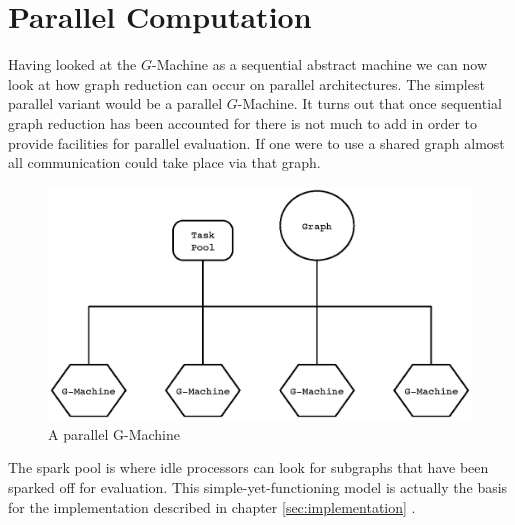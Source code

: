 \section{Parallel Computation}
    Having looked at the $G$-Machine as a sequential abstract machine we can now
look at how graph reduction can occur on parallel architectures. The simplest
parallel variant would be a parallel $G$-Machine. It turns out that once
sequential graph reduction has been accounted for there is not much to add in
order to provide facilities for parallel evaluation. If one were to use a shared
graph almost all communication could take place via that graph.

\begin{figure}[hb]
  \centering
  \includegraphics[scale=0.7]{Background/figures/simpleParallel.eps}
  \caption[Simple parallel graph reduction model]
   {A parallel G-Machine}
    \label{fig:simpleGMachine}
\end{figure}

The spark pool is where idle processors can look for subgraphs that have been
sparked off for evaluation. This simple-yet-functioning model is actually the
basis for the implementation described in chapter \ref{sec:implementation}
\cite{PeytonJones:1992:IFL:129390}.

